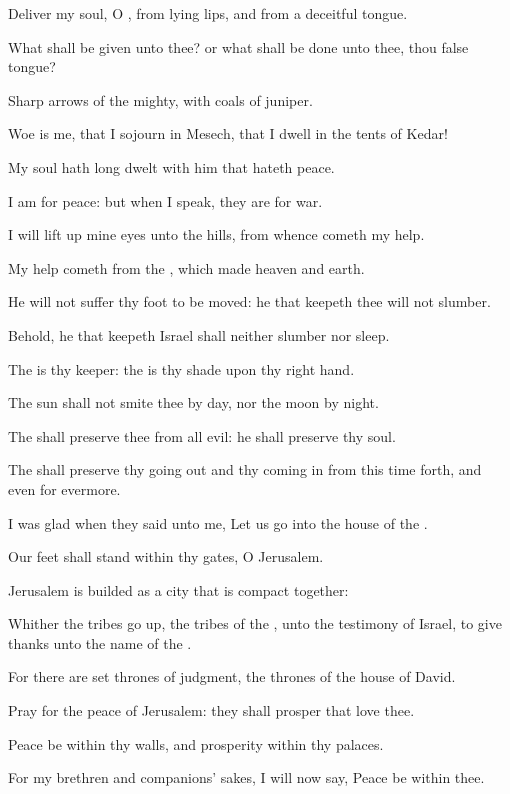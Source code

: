 \Verse Deliver my soul, O \LORD, from lying lips, and from a deceitful tongue.

\Verse What shall be given unto thee? or what shall be done unto thee, thou false tongue?

\Verse Sharp arrows of the mighty, with coals of juniper.

\Verse Woe is me, that I sojourn in Mesech, that I dwell in the tents of Kedar!

\Verse My soul hath long dwelt with him that hateth peace.

\Verse I am for peace: but when I speak, they are for war.




\Chapter
\Verse I will lift up mine eyes unto the hills, from whence cometh my help.

\Verse My help cometh from the \LORD, which made heaven and earth.

\Verse He will not suffer thy foot to be moved: he that keepeth thee will not slumber.

\Verse Behold, he that keepeth Israel shall neither slumber nor sleep.

\Verse The \LORD is thy keeper: the \LORD is thy shade upon thy right hand.

\Verse The sun shall not smite thee by day, nor the moon by night.

\Verse The \LORD shall preserve thee from all evil: he shall preserve thy soul.

\Verse The \LORD shall preserve thy going out and thy coming in from this time forth, and even for evermore.




\Chapter
\Verse I was glad when they said unto me, Let us go into the house of the \LORD.

\Verse Our feet shall stand within thy gates, O Jerusalem.

\Verse Jerusalem is builded as a city that is compact together:

\Verse Whither the tribes go up, the tribes of the \LORD, unto the testimony of Israel, to give thanks unto the name of the \LORD.

\Verse For there are set thrones of judgment, the thrones of the house of David.

\Verse Pray for the peace of Jerusalem: they shall prosper that love thee.

\Verse Peace be within thy walls, and prosperity within thy palaces.

\Verse For my brethren and companions' sakes, I will now say, Peace be within thee.

